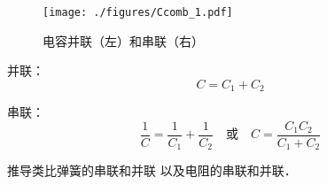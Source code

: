 

\begin{figure}[ht]
\centering
\texttt{[image: ./figures/Ccomb\_1.pdf]}
\caption{电容并联（左）和串联（右）} \label{Ccomb_fig1}
\end{figure}

并联：
\begin{equation}
C = C_1 + C_2
\end{equation}

串联：
\begin{equation}
\frac{1}{C} = \frac{1}{C_1} + \frac{1}{C_2}
\quad \text{或} \quad
C = \frac{C_1C_2}{C_1 + C_2}
\end{equation}

推导类比弹簧的串联和并联 以及电阻的串联和并联．
